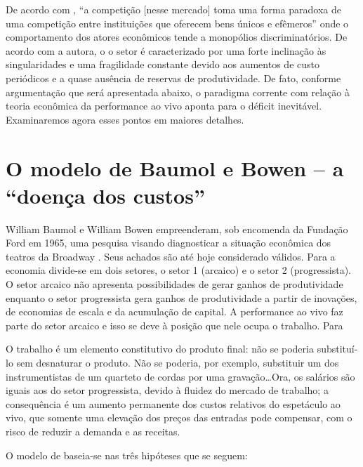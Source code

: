 \documentclass[a4paper, 12pt, openright, oneside, german, french, english, brazil]{abntex2}
\begin{document}
	De acordo com , ``a competição [nesse mercado] toma uma forma paradoxa de uma competição entre instituições que oferecem bens únicos e efêmeros'' onde o comportamento dos atores econômicos tende a monopólios discriminatórios. De acordo com a autora, o o setor é caracterizado por uma forte inclinação às singularidades e uma fragilidade constante devido aos aumentos de custo periódicos e a quase ausência de reservas de produtividade. De fato, conforme argumentação que será apresentada abaixo, o paradigma corrente com relação à teoria econômica da performance ao vivo aponta para o déficit inevitável. Examinaremos agora esses pontos em maiores detalhes.
	

	\section{O modelo de Baumol e Bowen -- a ``doença dos custos''}

	William Baumol e William Bowen empreenderam, sob encomenda da Fundação Ford em 1965, uma pesquisa visando diagnosticar a situação econômica dos teatros da Broadway \cite{benhamou2007economia}. Seus achados são até hoje considerado válidos. Para  a economia divide-se em dois setores, o setor 1 (arcaico) e o setor 2 (progressista). O setor arcaico não apresenta possibilidades de gerar ganhos de produtividade enquanto o setor progressista gera ganhos de produtividade a partir de inovações, de economias de escala e da acumulação de capital. A performance ao vivo faz parte do setor arcaico e isso se deve à posição que nele ocupa o trabalho. Para 

	\begin{citacao}
		O trabalho é um elemento constitutivo do produto final: não se poderia substituí-lo sem desnaturar o produto. Não se poderia, por exemplo, substituir um dos instrumentistas de um quarteto de cordas por uma gravação\ldots Ora, os salários são iguais aos do setor progressista, devido à fluidez do mercado de trabalho; a consequência é um aumento permanente dos custos relativos do espetáculo ao vivo, que somente uma elevação dos preços das entradas pode compensar, com o risco de reduzir a demanda e as receitas.
	\end{citacao}

	O modelo de  baseia-se nas três hipóteses que se seguem:
\end{document}

